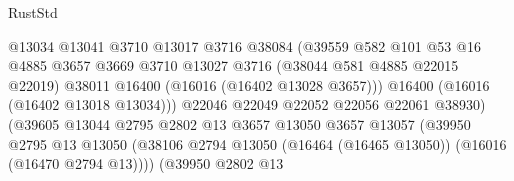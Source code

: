 \begin{lexlean}{RustStd}
\begin{coremodule}
                                            @13034
                                            @13041
                                            @3710
                                            @13017
                                            @3716
                                            @38084
                                            (@39559
                                              @582
                                              @101
                                              @53
                                              @16
                                              @4885
                                              @3657
                                              @3669
                                              @3710
                                              @13027
                                              @3716
                                              (@38044 @581 @4885 @22015 @22019)
                                              @38011
                                              @16400
                                              (@16016 (@16402 @13028 @3657)))
                                            @16400
                                            (@16016 (@16402 @13018 @13034)))
                                          @22046
                                          @22049
                                          @22052
                                          @22056
                                          @22061
                                          @38930)
                                        (@39605
                                          @13044
                                          @2795
                                          @2802
                                          @13
                                          @3657
                                          @13050
                                          @3657
                                          @13057
                                          (@39950
                                            @2795
                                            @13
                                            @13050
                                            (@38106
                                              @2794
                                              @13050
                                              (@16464 (@16465 @13050))
                                              (@16016 (@16470 @2794 @13))))
                                          (@39950
                                            @2802
                                            @13

\end{coremodule}
\end{lexlean}
